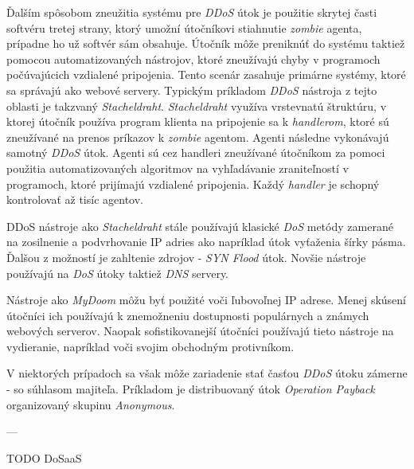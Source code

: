 \documentclass[
  printed, %
  table,   %
  lof,     %
  lot,     %
]{fithesis3}
\begin{document}
Ďalším spôsobom zneužitia systému pre \textit{DDoS} útok je použitie skrytej časti softvéru tretej
strany, ktorý umožní útočníkovi stiahnutie \textit{zombie} agenta, prípadne ho už softvér sám obsahuje.
Útočník môže preniknúť do systému taktiež pomocou automatizovaných nástrojov, ktoré zneužívajú chyby v
programoch počúvajúcich vzdialené pripojenia. Tento scenár zasahuje primárne systémy, ktoré sa správajú
ako webové servery. Typickým príkladom \textit{DDoS} nástroja z tejto oblasti je takzvaný
\textit{Stacheldraht}. \textit{Stacheldraht} využíva vrstevnatú štruktúru, v ktorej útočník používa
program klienta na pripojenie sa k \textit{handlerom}, ktoré sú zneužívané na prenos príkazov
k \textit{zombie} agentom. Agenti následne vykonávajú samotný \textit{DDoS} útok. Agenti sú cez handleri
zneužívané útočníkom za pomoci použitia automatizovaných algoritmov na vyhľadávanie zraniteľností v
programoch, ktoré prijímajú vzdialené pripojenia. Každý \textit{handler} je schopný kontrolovať až tisíc
agentov. 

DDoS nástroje ako \textit{Stacheldraht} stále používajú klasické \textit{DoS} metódy zamerané na
zosilnenie a podvrhovanie IP adries ako napríklad útok vyťaženia šírky pásma. Ďalšou z možností je
zahltenie zdrojov - \textit{SYN Flood} útok. Novšie nástroje používajú na \textit{DoS} útoky taktiež
\textit{DNS} servery.

Nástroje ako \textit{MyDoom} môžu byť použité voči ľubovoľnej IP adrese. Menej skúsení útočníci ich
používajú k znemožneniu dostupnosti populárnych a známych webových serverov. Naopak sofistikovanejší
útočníci používajú tieto nástroje na vydieranie, napríklad voči svojim obchodným protivníkom.

V niektorých prípadoch sa však môže zariadenie stať časťou \textit{DDoS} útoku zámerne - so súhlasom
majiteľa. Príkladom je distribuovaný útok \textit{Operation Payback} organizovaný skupinu
\textit{Anonymous}.

---

TODO DoSaaS


\end{document}
